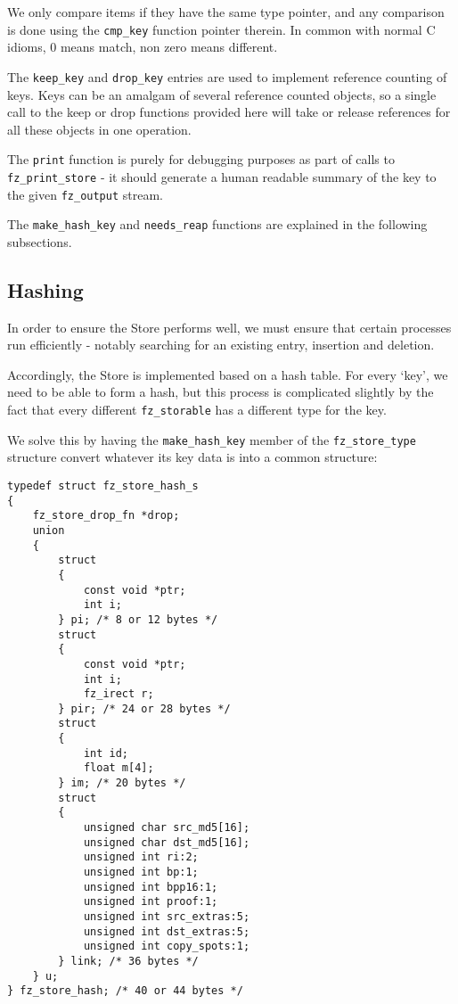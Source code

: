 \documentclass[oneside]{book}
\begin{document}
We only compare items if they have the same type pointer, and any comparison is done using the \texttt{cmp\_key} function pointer therein. In common with normal C idioms, 0 means match, non zero means different.

The \texttt{keep\_key} and \texttt{drop\_key} entries are used to implement reference counting of keys. Keys can be an amalgam of several reference counted objects, so a single call to the keep or drop functions provided here will take or release references for all these objects in one operation.

The \texttt{print} function is purely for debugging purposes as part of calls to \texttt{fz\_print\_store} - it should generate a human readable summary of the key to the given \texttt{fz\_output} stream.

The \texttt{make\_hash\_key} and \texttt{needs\_reap} functions are explained in the following subsections.

\subsection{Hashing}

In order to ensure the Store performs well, we must ensure that certain processes run efficiently - notably searching for an existing entry, insertion and deletion.

Accordingly, the Store is implemented based on a hash table. For every `key', we need to be able to form a hash, but this process is complicated slightly by the fact that every different \texttt{fz\_storable} has a different type for the key.

We solve this by having the \texttt{make\_hash\_key} member of the \texttt{fz\_store\_type} structure convert whatever its key data is into a common structure:

\begin{lstlisting}
typedef struct fz_store_hash_s
{
	fz_store_drop_fn *drop;
	union
	{
		struct
		{
			const void *ptr;
			int i;
		} pi; /* 8 or 12 bytes */
		struct
		{
			const void *ptr;
			int i;
			fz_irect r;
		} pir; /* 24 or 28 bytes */
		struct
		{
			int id;
			float m[4];
		} im; /* 20 bytes */
		struct
		{
			unsigned char src_md5[16];
			unsigned char dst_md5[16];
			unsigned int ri:2;
			unsigned int bp:1;
			unsigned int bpp16:1;
			unsigned int proof:1;
			unsigned int src_extras:5;
			unsigned int dst_extras:5;
			unsigned int copy_spots:1;
		} link; /* 36 bytes */
	} u;
} fz_store_hash; /* 40 or 44 bytes */
\end{lstlisting}
\end{document}

